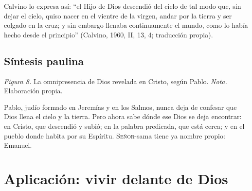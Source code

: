 \documentclass[11pt,letterpaper]{article}
\newcommand{\SENOR}{\textsc{Señor}}
\begin{document}
\begin{nota}[Precisión]
Calvino lo expresa así: ``el Hijo de Dios descendió del cielo de tal modo que, sin dejar el cielo, quiso nacer en el vientre de la virgen, andar por la tierra y ser colgado en la cruz; y sin embargo llenaba continuamente el mundo, como lo había hecho desde el principio'' (Calvino, 1960, II, 13, 4; traducción propia).
\end{nota}

\subsection{Síntesis paulina}

\begin{center}
\par
{\footnotesize\color{gris}\textit{Figura 8.} La omnipresencia de Dios revelada en Cristo, según Pablo. \textit{Nota.} Elaboración propia.}
\end{center}

Pablo, judío formado en Jeremías y en los Salmos, nunca deja de confesar que Dios llena el cielo y la tierra. Pero ahora sabe dónde ese Dios se deja encontrar: en Cristo, que descendió y subió; en la palabra predicada, que está cerca; y en el pueblo donde habita por su Espíritu. \SENOR{}-sama tiene ya nombre propio: Emanuel.

\section{Aplicación: vivir delante de Dios}
\end{document}
